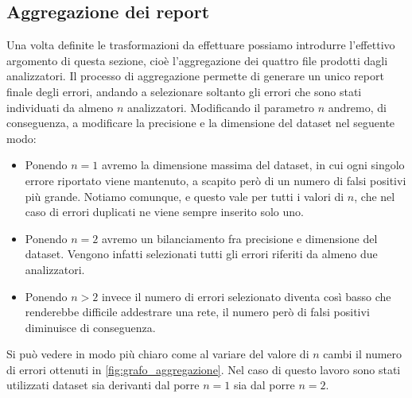 
\subsection{Aggregazione dei report}
Una volta definite le trasformazioni da effettuare possiamo introdurre l'effettivo argomento di questa sezione, cioè l'aggregazione dei quattro file prodotti dagli analizzatori.
Il processo di aggregazione permette di generare un unico report finale degli errori, andando a selezionare soltanto gli errori che sono stati individuati da almeno $n$ analizzatori. 
Modificando il parametro $n$ andremo, di conseguenza, a modificare la precisione e la dimensione del dataset nel seguente modo:
  \begin{itemize}
    \item Ponendo $n=1$ avremo la dimensione massima del dataset, in cui ogni singolo errore riportato viene mantenuto, a scapito però di un numero di falsi positivi più grande.
          Notiamo comunque, e questo vale per tutti i valori di $n$, che nel caso di errori duplicati ne viene sempre inserito solo uno.
    \item Ponendo $n=2$ avremo un bilanciamento fra precisione e dimensione del dataset. Vengono infatti selezionati tutti gli errori riferiti da almeno due analizzatori. 
    \item Ponendo $n>2$ invece il numero di errori selezionato diventa così basso che renderebbe difficile addestrare una rete, il numero però di falsi positivi diminuisce di conseguenza.
  \end{itemize}
Si può vedere in modo più chiaro come al variare del valore di $n$ cambi il numero di errori ottenuti in \autoref{fig:grafo_aggregazione}.
Nel caso di questo lavoro sono stati utilizzati dataset sia derivanti dal porre $n=1$ sia dal porre $n=2$.

